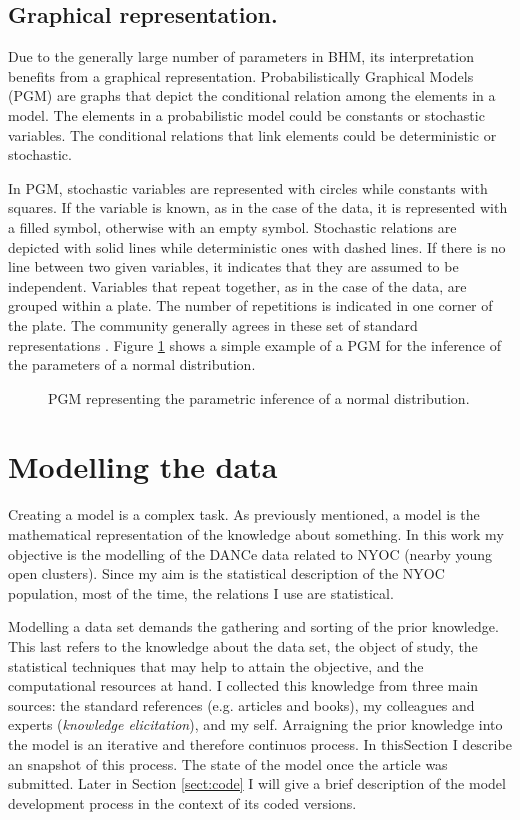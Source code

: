 \subsection{Graphical representation.}
Due to the generally large number of parameters in BHM, its interpretation benefits from a graphical representation. Probabilistically Graphical Models (PGM) are graphs that depict the conditional relation among the elements in a model. The elements in a probabilistic model could be constants or stochastic variables. The conditional relations that link elements could be deterministic or stochastic. 

In PGM, stochastic variables are represented with circles while constants with squares. If the variable is known, as in the case of the data, it is represented with a filled symbol, otherwise with an empty symbol. Stochastic relations are depicted with solid lines while deterministic ones with dashed lines. If there is no line between two given variables, it indicates that they are assumed to be independent. Variables that repeat together, as in the case of the data, are grouped within a plate. The number of repetitions is indicated in one corner of the plate. The community generally agrees in these set of standard representations \cite[for more details on PGM see for example the book of][]{Koller2009}. Figure \ref{fig:pgm} shows a simple example of a PGM for the inference of the parameters of a normal distribution.

\begin{figure}[htbp]
\begin{center}
\caption{PGM representing the parametric inference of a normal distribution.}
\label{fig:pgm}
\end{center}
\end{figure}

\section{Modelling the data}
Creating a model is a complex task. As previously mentioned, a model is the mathematical representation of the knowledge about something. In this work my objective is the modelling of the DANCe data related to NYOC (nearby young open clusters). Since my aim is  the statistical description of the NYOC population, most of the time, the relations I use are statistical.

Modelling a data set demands the gathering and sorting of the prior knowledge. This last refers to the knowledge about the data set, the object of study, the statistical techniques that may help to attain the objective, and the computational resources at hand. I collected this knowledge from three main sources: the standard references (e.g. articles and books), my colleagues and experts (\emph{knowledge elicitation}), and my self. Arraigning the prior knowledge into the model is an iterative and therefore continuos process. In thisSection I describe an snapshot of this process. The state of the model once the article \citet{Olivares2017} was submitted. Later in Section \ref{sect:code} I will give a brief description of the model development process in the context of its coded versions.

